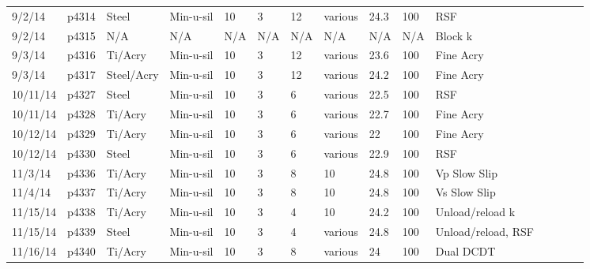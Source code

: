 \begin{landscape}
\begin{longtable} {lllllllllllllll}
9/2/14   & p4314      & Steel            & Min-u-sil    & 10           & 3         & 12            & various                      & 24.3        & 100      & RSF\\
9/2/14   & p4315      & N/A              & N/A          & N/A          & N/A       & N/A           & N/A                          & N/A         & N/A      & Block k\\
9/3/14   & p4316      & Ti/Acry & Min-u-sil    & 10           & 3         & 12            & various                      & 23.6        & 100      & Fine Acry\\
9/3/14   & p4317      & Steel/Acry    & Min-u-sil    & 10           & 3         & 12            & various                      & 24.2        & 100      & Fine Acry\\
10/11/14 & p4327      & Steel            & Min-u-sil    & 10           & 3         & 6             & various                      & 22.5        & 100      & RSF\\
10/11/14 & p4328      & Ti/Acry & Min-u-sil    & 10           & 3         & 6             & various                      & 22.7        & 100      & Fine Acry\\
10/12/14 & p4329      & Ti/Acry & Min-u-sil    & 10           & 3         & 6             & various                      & 22          & 100      & Fine Acry\\
10/12/14 & p4330      & Steel            & Min-u-sil    & 10           & 3         & 6             & various                      & 22.9        & 100      & RSF\\
11/3/14  & p4336      & Ti/Acry & Min-u-sil    & 10           & 3         & 8             & 10                           & 24.8        & 100      & Vp Slow Slip\\
11/4/14  & p4337      & Ti/Acry & Min-u-sil    & 10           & 3         & 8             & 10                           & 24.8        & 100      & Vs Slow Slip\\
11/15/14 & p4338      & Ti/Acry & Min-u-sil    & 10           & 3         & 4             & 10                           & 24.2        & 100      & Unload/reload k\\
11/15/14 & p4339      & Steel            & Min-u-sil    & 10           & 3         & 4             & various                      & 24.8        & 100      & Unload/reload, RSF\\
11/16/14 & p4340      & Ti/Acry & Min-u-sil    & 10           & 3         & 8             & various                      & 24          & 100      & Dual DCDT\\

\end{longtable}
\end{landscape}
